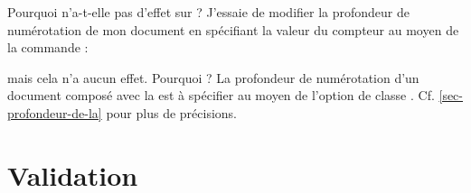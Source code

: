 \begin{dbfaq}{Pourquoi \protect{} n'a-t-elle pas
    d'effet sur \protect{} ?}{}
  J'essaie de modifier la profondeur de numérotation de mon document en
  spécifiant la valeur du compteur  au moyen de la
  commande :
\begin{preamblecode}
\end{preamblecode}
  mais cela n'a aucun effet. Pourquoi ?
  \tcblower
  La profondeur de numérotation d'un document composé avec la \yatCl{} est
  à spécifier au moyen de l'option de classe
  . Cf. \vref{sec-profondeur-de-la} pour plus de
  précisions.
\end{dbfaq}

\section{Validation}
\label{sec-validation}

